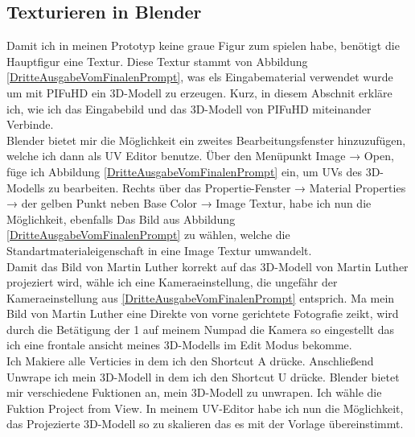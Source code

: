 \subsection{Texturieren in Blender}

Damit ich in meinen Prototyp keine graue Figur zum spielen habe, benötigt die Hauptfigur eine Textur. Diese Textur stammt von Abbildung \ref{DritteAusgabeVomFinalenPrompt}, was els Eingabematerial verwendet wurde um mit PIFuHD ein 3D-Modell zu erzeugen. Kurz, in diesem Abschnit erkläre ich, wie ich das Eingabebild und das 3D-Modell von PIFuHD miteinander Verbinde.
\\
Blender bietet mir die Möglichkeit ein zweites Bearbeitungsfenster hinzuzufügen, welche ich dann als UV Editor benutze. Über den Menüpunkt Image → Open, füge ich Abbildung \ref{DritteAusgabeVomFinalenPrompt} ein, um UVs des 3D-Modells zu bearbeiten. Rechts über das Propertie-Fenster → Material Properties → der gelben Punkt neben Base Color → Image Textur, habe ich nun die Möglichkeit, ebenfalls Das Bild aus Abbildung \ref{DritteAusgabeVomFinalenPrompt} zu wählen, welche die Standartmaterialeigenschaft in eine Image Textur umwandelt.
\\
Damit das Bild von Martin Luther korrekt auf das 3D-Modell von Martin Luther projeziert wird, wähle ich eine Kameraeinstellung, die ungefähr der Kameraeinstellung aus \ref{DritteAusgabeVomFinalenPrompt} entsprich. Ma mein Bild von Martin Luther eine Direkte von vorne gerichtete Fotografie zeikt, wird durch die Betätigung der 1 auf meinem Numpad die Kamera so eingestellt das ich eine frontale ansicht meines 3D-Modells im Edit Modus bekomme.
\\
Ich Makiere alle Verticies in dem ich den Shortcut A drücke. Anschließend Unwrape ich mein 3D-Modell in dem ich den Shortcut U drücke. Blender bietet mir verschiedene Fuktionen an, mein 3D-Modell zu unwrapen. Ich wähle die Fuktion Project from View. In meinem UV-Editor habe ich nun die Möglichkeit, das Projezierte 3D-Modell so zu skalieren das es mit der Vorlage übereinstimmt.
\\
